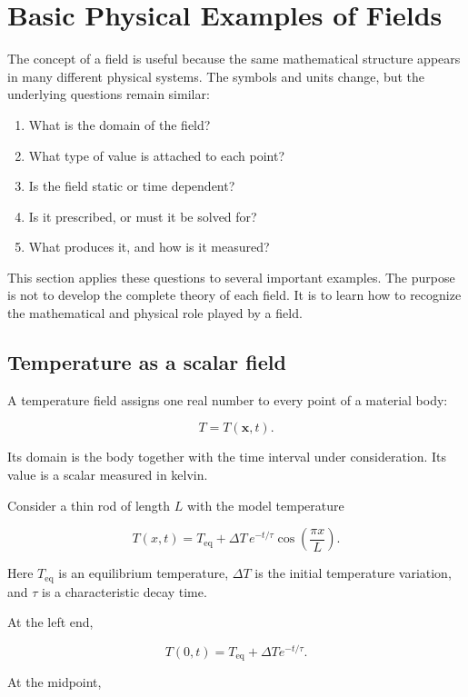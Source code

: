 \section{Basic Physical Examples of Fields}
\label{sec:basic_physical_field_examples}

The concept of a field is useful because the same mathematical structure appears in many different physical systems. The symbols and units change, but the underlying questions remain similar:

\begin{enumerate}
    \item What is the domain of the field?
    \item What type of value is attached to each point?
    \item Is the field static or time dependent?
    \item Is it prescribed, or must it be solved for?
    \item What produces it, and how is it measured?
\end{enumerate}

This section applies these questions to several important examples. The purpose is not to develop the complete theory of each field. It is to learn how to recognize the mathematical and physical role played by a field.

\subsection{Temperature as a scalar field}

A temperature field assigns one real number to every point of a material body:

\[
T=T(\mathbf{x},t).
\]

Its domain is the body together with the time interval under consideration. Its value is a scalar measured in kelvin.

Consider a thin rod of length \(L\) with the model temperature

\[
T(x,t)
=
T_{\mathrm{eq}}
+
\Delta T\,
e^{-t/\tau}
\cos\left(\frac{\pi x}{L}\right).
\]

Here \(T_{\mathrm{eq}}\) is an equilibrium temperature, \(\Delta T\) is the initial temperature variation, and \(\tau\) is a characteristic decay time.

At the left end,

\[
T(0,t)
=
T_{\mathrm{eq}}
+
\Delta T e^{-t/\tau}.
\]

At the midpoint,

